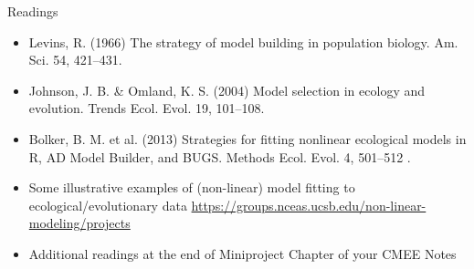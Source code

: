 \documentclass[xcolor=x11names,handout,compress]{beamer}
\renewcommand{\(}{\begin{columns}}
\renewcommand{\)}{\end{columns}}
\newcommand{\<}[1]{\begin{column}{#1}}
\renewcommand{\>}{\end{column}}
\begin{document}
\begin{frame}{Readings}

\begin{itemize}

\item Levins, R. (1966) The strategy of model building in population 
biology. Am. Sci. 54, 421--431.  

\item Johnson, J. B. \& Omland, K. S. (2004) Model selection in ecology 
and evolution. Trends Ecol. Evol. 19, 101--108. 

\item Bolker, B. M. et al.  (2013) Strategies for fitting nonlinear ecological models in R, AD Model Builder, and BUGS. Methods Ecol. Evol. 4, 501--512 .

\item Some illustrative examples of (non-linear) model fitting to 
ecological/evolutionary data 
\url{https://groups.nceas.ucsb.edu/non-linear-modeling/projects} 

\item Additional readings at the end of Miniproject Chapter of your CMEE Notes 
 
\end{itemize}
\end{frame}
\end{document}
